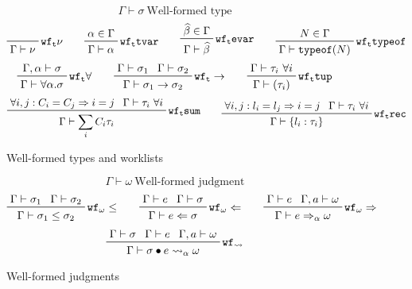 \documentclass[letterpaper]{article}
\newcommand{\utv}{\alpha}             %
\newcommand{\etv}{\widehat{\beta}}    %
\begin{document}
\begin{figure}
  $$ \boxed{\Gamma\vdash\sigma}\ \textrm{Well-formed type}  $$
  $$ \prfbyaxiom{$\mathtt{wf_t \nu}$}{\Gamma\vdash\nu}\qquad
     \prftree[r]{$\mathtt{wf_t tvar}$}
             {\prfassumption{\utv\in\Gamma}}
             {\Gamma\vdash\utv}\qquad
     \prftree[r]{$\mathtt{wf_t evar}$}
             {\prfassumption{\etv\in\Gamma}}
             {\Gamma\vdash\etv}\qquad
     \prftree[r]{$\mathtt{wf_t typeof}$}
             {\prfassumption{N\in\Gamma}}
             {\Gamma\vdash\texttt{typeof}(N)} $$
  $$ \prftree[r]{$\mathtt{wf_t \forall}$}
             {\prfassumption{\Gamma,\utv\vdash\sigma}}
             {\Gamma\vdash\forall\utv.\sigma}\qquad
     \prftree[r]{$\mathtt{wf_t \rightarrow}$}
             {\prfassumption{\Gamma\vdash\sigma_1}}{\prfassumption{\Gamma\vdash\sigma_2}}
             {\Gamma\vdash\sigma_1\rightarrow\sigma_2}\qquad
     \prftree[r]{$\mathtt{wf_t tup}$}
             {\prfassumption{\Gamma\vdash\tau_i\ \forall i}}
             {\Gamma\vdash(\tau_i)} $$
  $$ \prftree[r]{$\mathtt{wf_t sum}$}
             {\prfassumption{\forall i,j:C_i=C_j\Rightarrow i=j}}
             {\prfassumption{\Gamma\vdash\tau_i\ \forall i}}
             {\Gamma\vdash\sum_i C_i\tau_i}\qquad
     \prftree[r]{$\mathtt{wf_t rec}$}
             {\prfassumption{\forall i,j:l_i=l_j\Rightarrow i=j}}
             {\prfassumption{\Gamma\vdash\tau_i\ \forall i}}
             {\Gamma\vdash\{l_i:\tau_i\}} $$
  \caption{Well-formed types and worklists}
  \label{f:defs:wf:types:worklists}
\end{figure}

\begin{figure}
  $$ \boxed{\Gamma\vdash\omega}\ \textrm{Well-formed judgment} $$
  $$ \prftree[r]{$\mathtt{wf_\omega \leq}$}
             {\prfassumption{\Gamma\vdash\sigma_1}}{\prfassumption{\Gamma\vdash\sigma_2}}
             {\Gamma\vdash\sigma_1\leq\sigma_2}\qquad
     \prftree[r]{$\mathtt{wf_\omega\Leftarrow}$}
             {\prfassumption{\Gamma\vdash e}}{\prfassumption{\Gamma\vdash\sigma}}
             {\Gamma\vdash e\Leftarrow\sigma}\qquad
     \prftree[r]{$\mathtt{wf_\omega\Rightarrow}$}
             {\prfassumption{\Gamma\vdash e}}{\prfassumption{\Gamma,a\vdash\omega}}
             {\Gamma\vdash e\Rightarrow_\utv\omega} $$
  $$ \prftree[r]{$\mathtt{wf_\rightsquigarrow}$}
             {\prfassumption{\Gamma\vdash\sigma}}{\prfassumption{\Gamma\vdash e}}
             {\prfassumption{\Gamma,a\vdash\omega}}
             {\Gamma\vdash\sigma\bullet e\rightsquigarrow_\utv\omega} $$
  \caption{Well-formed judgments}
  \label{f:wf:judgments}
\end{figure}
\end{document}
